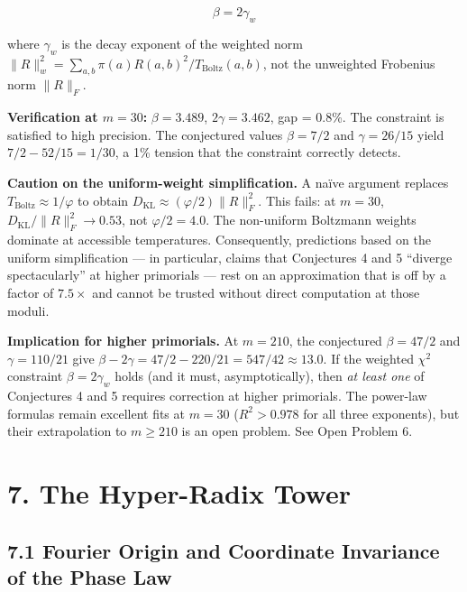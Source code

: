 \documentclass[
  11pt,
]{article}
\numberwithin{equation}{section}
\begin{document}
\begin{equation}\boxed{\beta = 2\gamma_w}\end{equation}

where \(\gamma_w\) is the decay exponent of the weighted norm
\(\|R\|_w^2 = \sum_{a,b} \pi(a) R(a,b)^2 / T_{\text{Boltz}}(a,b)\), not
the unweighted Frobenius norm \(\|R\|_F\).

\textbf{Verification at \(m = 30\):} \(\beta = 3.489\),
\(2\gamma = 3.462\), gap = 0.8\%. The constraint is satisfied to high
precision. The conjectured values \(\beta = 7/2\) and \(\gamma = 26/15\)
yield \(7/2 - 52/15 = 1/30\), a 1\% tension that the constraint
correctly detects.

\textbf{Caution on the uniform-weight simplification.} A naïve argument
replaces \(T_{\text{Boltz}} \approx 1/\varphi\) to obtain
\(D_{\text{KL}} \approx (\varphi/2)\|R\|_F^2\). This fails: at
\(m = 30\), \(D_{\text{KL}}/\|R\|_F^2 \to 0.53\), not
\(\varphi/2 = 4.0\). The non-uniform Boltzmann weights dominate at
accessible temperatures. Consequently, predictions based on the uniform
simplification --- in particular, claims that Conjectures 4 and 5
``diverge spectacularly'' at higher primorials --- rest on an
approximation that is off by a factor of \(7.5\times\) and cannot be
trusted without direct computation at those moduli.

\textbf{Implication for higher primorials.} At \(m = 210\), the
conjectured \(\beta = 47/2\) and \(\gamma = 110/21\) give
\(\beta - 2\gamma = 47/2 - 220/21 = 547/42 \approx 13.0\). If the
weighted \(\chi^2\) constraint \(\beta = 2\gamma_w\) holds (and it must,
asymptotically), then \emph{at least one} of Conjectures 4 and 5
requires correction at higher primorials. The power-law formulas remain
excellent fits at \(m = 30\) (\(R^2 > 0.978\) for all three exponents),
but their extrapolation to \(m \geq 210\) is an open problem. See Open
Problem 6.

\setcounter{section}{7}\setcounter{equation}{0}
\setcounter{section}{7}\setcounter{equation}{0}
\section{7. The Hyper-Radix Tower}\label{the-hyper-radix-tower}

\subsection{7.1 Fourier Origin and Coordinate Invariance of the Phase
Law}\label{fourier-origin-and-coordinate-invariance-of-the-phase-law}
\end{document}
